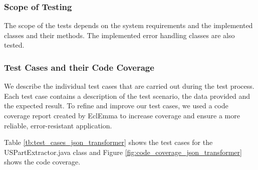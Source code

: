 \subsubsection*{Scope of Testing}
The scope of the tests depends on the system requirements and the implemented classes and their methods. The implemented error handling classes are also tested.
\subsubsection*{Test Cases and their Code Coverage}
We describe the individual test cases that are carried out during the test process. Each test case contains a description of the test scenario, the data provided and the expected result. To refine and improve our test cases, we used a code coverage report created by EclEmma to increase coverage and ensure a more reliable, error-resistant application.

Table \ref{tb:test_cases_json_transformer} shows the test cases for the USPartExtractor.java class and Figure \ref{fig:code_coverage_json_transformer} shows the code coverage.


